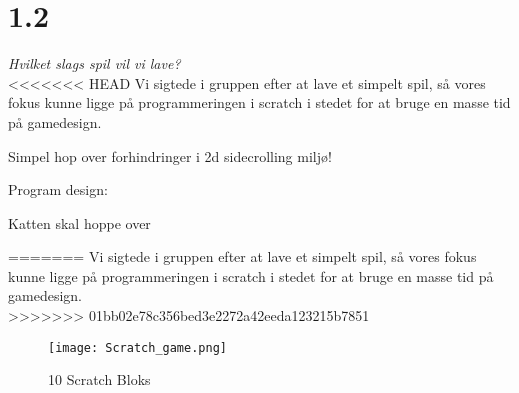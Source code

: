 \section{1.2}

\textit{Hvilket slags spil vil vi lave?}\\
<<<<<<< HEAD
Vi sigtede i gruppen efter at lave et simpelt spil, så vores fokus kunne ligge på programmeringen i scratch i stedet for at bruge en masse tid på gamedesign.

Simpel hop over forhindringer i 2d sidecrolling miljø!

Program design:

Katten skal hoppe over 

=======
Vi sigtede i gruppen efter at lave et simpelt spil,
så vores fokus kunne ligge på programmeringen i scratch
i stedet for at bruge en masse tid på gamedesign.\\
>>>>>>> 01bb02e78c356bed3e2272a42eeda123215b7851

\begin{figure}[ht]
	\centering
	\texttt{[image: Scratch\_game.png]}
	\caption{{10 Scratch Bloks}}
	\label{fig:Version_0.1}
\end{figure}

